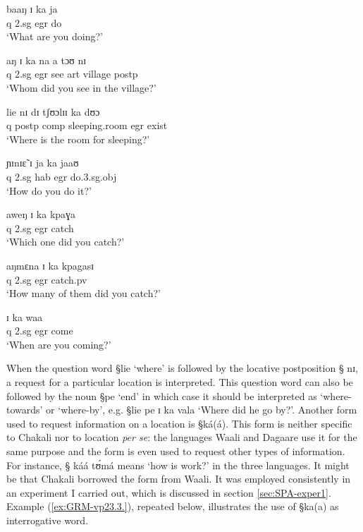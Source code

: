   
  \begin{exe}
  \ex\label{ex:GRM-interg-pro}
   \begin{xlist}
 
\ex\label{ex:vp1.11.a}
\gll baaŋ ɪ ka ja \\
{\sc q} {\sc 2.sg} {\sc egr} do\\
\glt `What are you doing?' 


\ex\label{ex:vp2.5}
\gll aŋ ɪ ka na a tɔʊ nɪ \\
     {\sc q} {\sc 2.sg}  {\sc egr}  see {\sc art} village {\sc postp} \\
\glt  `Whom did you see in the village?' 

\ex\label{ex:vp9.25}
\gll lie nɪ dɪ tʃʊɔlɪɪ ka dʊɔ \\
        {\sc q} {\sc postp} {\sc comp} sleeping.room   {\sc egr} exist \\
\glt  `Where is the room for sleeping?' 



\ex\label{ex:vp22.4.1.}
\gll ɲɪnɪɛ̃ ɪ ja ka jaaʊ \\
      {\sc q}  {\sc 2.sg} {\sc hab}   {\sc egr} do.{\sc 3.sg.obj} \\
\glt  `How do you do it?' 



\ex\label{ex:vp22.4.4.}
\gll aweŋ ɪ ka kpaɣa \\
      {\sc q}   {\sc 2.sg}  {\sc  egr}    catch  \\
\glt  `Which one did you catch?' 


\ex\label{ex:vp22.4.10.}
\gll aŋmɛna ɪ ka kpagasɪ \\
         {\sc q}    {\sc 2.sg}  {\sc  egr}  catch.{\sc pv}  \\
\glt  `How many of them did you catch?' 

\ex\label{ex:vp22.4.15.}
 ɪ ka waa \\
       {\sc q} {\sc 2.sg} {\sc  egr}    come \\
\glt  `When are you coming?' 
  
   \end{xlist}
  \end{exe}


When the question word {\S lie} `where' is  followed by the locative
postposition {\S
nɪ},  a request for a particular location is interpreted. This question word can
also be
followed by the noun  {\S pe} `end' in which case it should be interpreted
as
`where-towards' or `where-by', e.g. {\S lie pe ɪ ka vala} `Where did he go
by?'.  Another form used to request information on a location is {\S ká(á)}.
This form is neither specific to Chakali nor to location {\it per se}:
the languages Waali and Dagaare use it for the same purpose and the
form is even used to request other types  of information. For instance, {\S
káá tʊ́má} means `how is work?' in the three languages. It might be that
Chakali borrowed the form from Waali.  It was
employed consistently in an experiment I carried out, which is discussed  in
section \ref{sec:SPA-exper1}. Example  (\ref{ex:GRM-vp23.3.}),  repeated below, 
illustrates the use of {\S ka(a)} as interrogative word.

